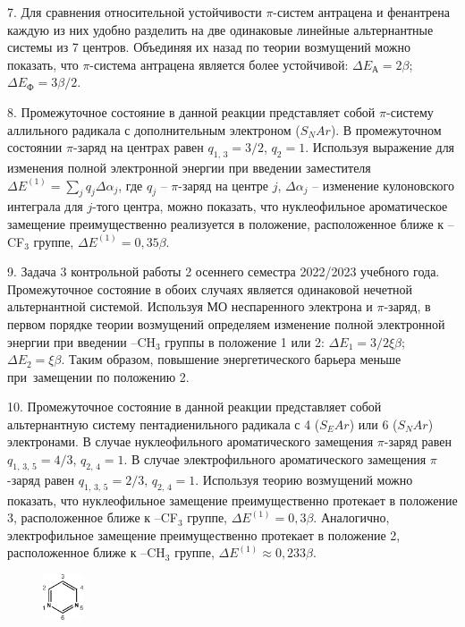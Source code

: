 7. Для сравнения относительной устойчивости $\pi$-систем антрацена и фенантрена каждую из них удобно разделить на две одинаковые линейные альтернантные системы из 7 центров. Объединяя их назад по теории возмущений можно показать, что $\pi$-система антрацена является более устойчивой: $\Delta E_{\textrm{А}}=2\beta$; $\Delta E_{\textrm{Ф}}=3\beta / 2$.\par
8. Промежуточное состояние в данной реакции представляет собой $\pi$-систему аллильного радикала с дополнительным электроном ($S_N Ar$). В промежуточном состоянии $\pi$-заряд на центрах равен $q_{1,\,3}=3/2$, $q_{2}=1$. Используя выражение для изменения полной электронной энергии при введении заместителя $\Delta E^{(1)}=\sum_j q_j\Delta\alpha_j$, где $q_j$ – $\pi$-заряд на центре $j$, $\Delta\alpha_j$ – изменение кулоновского интеграла для $j$-того центра, можно показать, что нуклеофильное ароматическое замещение преимущественно реализуется в положение, расположенное ближе к –CF$_3$ группе, $\Delta E^{(1)}=0,35\beta$.\par
9. Задача 3 контрольной работы 2 осеннего семестра 2022/2023 учебного года.  Промежуточное состояние в обоих случаях является одинаковой нечетной альтернантной системой. Используя МО неспаренного электрона и $\pi$-заряд, в первом порядке теории возмущений определяем изменение полной электронной энергии при введении –CH$_3$ группы в положение 1 или 2: $\Delta E_1=3/2 \xi \beta$; $\Delta E_2=\xi \beta$. Таким образом, повышение энергетического барьера меньше при~замещении по положению 2.\par
10. Промежуточное состояние в данной реакции представляет собой альтернантную систему пентадиенильного радикала с 4 ($S_E Ar$) или 6 ($S_N Ar$) электронами. В случае нуклеофильного ароматического замещения $\pi$-заряд равен $q_{1,\,3,\,5}=4/3$, $q_{2,\,4}=1$. В случае электрофильного ароматического замещения $\pi$-заряд равен $q_{1,\,3,\,5}=2/3$, $q_{2,\,4}=1$. Используя теорию возмущений можно показать, что нуклеофильное замещение преимущественно протекает в положение 3, расположенное ближе к –CF$_3$ группе, $\Delta E^{(1)} = 0,3\beta$. Аналогично, электрофильное замещение преимущественно протекает в положение 2, расположенное ближе к –CH$_3$ группе, $\Delta E^{(1)}\approx 0,233\beta$.\par
\begin{figure} %
    \centering
    \vspace{-2ex}
    \includegraphics[width=12mm]{images/Fig_1_9_11_dec.png}
    \vspace{-5mm}
\end{figure}
